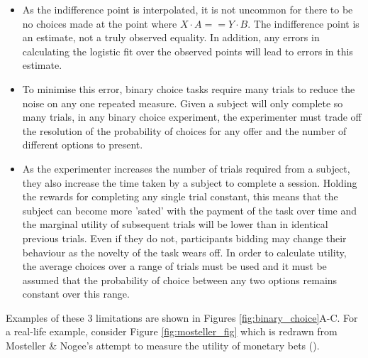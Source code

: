 \begin{itemize}
    \item As the indifference point is interpolated, it is not uncommon for there to be no choices made at the point where $X \cdot A == Y \cdot B$. The indifference point is an estimate, not a truly observed equality. In addition, any errors in calculating the logistic fit over the observed points will lead to errors in this estimate.
    \item To minimise this error, binary choice tasks require many trials to reduce the noise on any one repeated measure. Given a subject will only complete so many trials, in any binary choice experiment, the experimenter must trade off the resolution of the probability of choices for any offer and the number of different options to present.
    \item As the experimenter increases the number of trials required from a subject, they also increase the time taken by a subject to complete a session. Holding the rewards for completing any single trial constant, this means that the subject can become more 'sated' with the payment of the task over time and the marginal utility of subsequent trials will be lower than in identical previous trials. Even if they do not, participants bidding may change their behaviour as the novelty of the task wears off. In order to calculate utility, the average choices over a range of trials must be used and it must be assumed that the probability of choice between any two options remains constant over this range.
\end{itemize}

Examples of these 3 limitations are shown in Figures \ref{fig:binary_choice}A-C. For a real-life example, consider Figure \ref{fig:mosteller_fig} which is redrawn from Mosteller \& Nogee’s attempt to measure the utility of monetary bets (\cite{mostellerExperimentalMeasurementUtility1951}).

